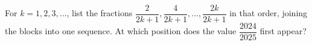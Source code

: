 For $k=1,2,3,\ldots$, list the fractions $\dfrac{2}{2k+1},\dfrac{4}{2k+1},\ldots,\dfrac{2k}{2k+1}$ in that order, joining the blocks into one sequence. At which position does the value $\dfrac{2024}{2025}$ first appear?
